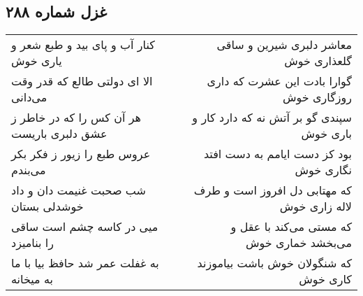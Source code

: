 \begin{center}
\section*{غزل شماره ۲۸۸}
\label{sec:sh288}
\begin{longtable}{l p{0.5cm} r}
کنار آب و پای بید و طبع شعر و یاری خوش
&&
معاشر دلبری شیرین و ساقی گلعذاری خوش
\\
الا ای دولتی طالع که قدر وقت می‌دانی
&&
گوارا بادت این عشرت که داری روزگاری خوش
\\
هر آن کس را که در خاطر ز عشق دلبری باریست
&&
سپندی گو بر آتش نه که دارد کار و باری خوش
\\
عروس طبع را زیور ز فکر بکر می‌بندم
&&
بود کز دست ایامم به دست افتد نگاری خوش
\\
شب صحبت غنیمت دان و داد خوشدلی بستان
&&
که مهتابی دل افروز است و طرف لاله زاری خوش
\\
میی در کاسه چشم است ساقی را بنامیزد
&&
که مستی می‌کند با عقل و می‌بخشد خماری خوش
\\
به غفلت عمر شد حافظ بیا با ما به میخانه
&&
که شنگولان خوش باشت بیاموزند کاری خوش
\\
\end{longtable}
\end{center}
